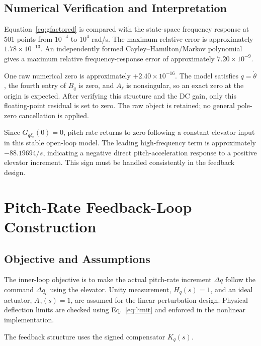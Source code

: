 \documentclass[a4paper,11pt]{article}
\newcommand{\Gq}{G_{q\delta_e}}
\begin{document}
\subsection{Numerical Verification and Interpretation}
Equation~\eqref{eq:gfactored} is compared with the state-space frequency response at 501 points from $10^{-4}$ to $10^4$ rad/s. The maximum relative error is approximately $1.78\times10^{-13}$. An independently formed Cayley--Hamilton/Markov polynomial gives a maximum relative frequency-response error of approximately $7.20\times10^{-9}$.

One raw numerical zero is approximately $+2.40\times10^{-16}$. The model satisfies $q=\dot\theta$, the fourth entry of $B_q$ is zero, and $A_\ell$ is nonsingular, so an exact zero at the origin is expected. After verifying this structure and the DC gain, only this floating-point residual is set to zero. The raw object is retained; no general pole-zero cancellation is applied.

Since $\Gq(0)=0$, pitch rate returns to zero following a constant elevator input in this stable open-loop model. The leading high-frequency term is approximately $-88.19694/s$, indicating a negative direct pitch-acceleration response to a positive elevator increment. This sign must be handled consistently in the feedback design.

\section{Pitch-Rate Feedback-Loop Construction}\label{sec:loop}
\subsection{Objective and Assumptions}
The inner-loop objective is to make the actual pitch-rate increment $\Delta q$ follow the command $\Delta q_c$ using the elevator. Unity measurement, $H_q(s)=1$, and an ideal actuator, $A_e(s)=1$, are assumed for the linear perturbation design. Physical deflection limits are checked using Eq.~\eqref{eq:limit} and enforced in the nonlinear implementation.

The feedback structure uses the signed compensator $K_q(s)$.
\end{document}
